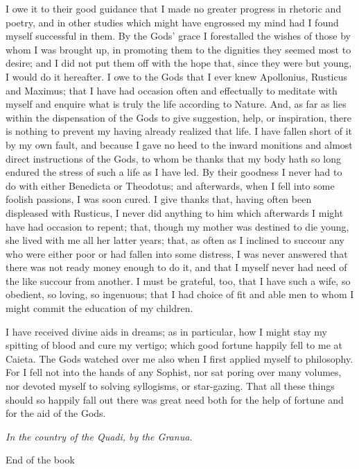 \documentclass{book}
\newcommand\terminus[1]{\vspace{2em}\emph{#1} \\[2em] \begin{center}End of the \ordinalstring{chapter} book\end{center}}
\begin{document}
I owe it to their good guidance that I made no greater progress in
rhetoric and poetry, and in other studies which might have engrossed
my mind had I found myself successful in them. By the Gods' grace I
forestalled the wishes of those by whom I was brought up, in promoting
them to the dignities they seemed most to desire; and I did not put
them off with the hope that, since they were but young, I would do it
hereafter. I owe to the Gods that I ever knew Apollonius, Rusticus and
Maximus; that I have had occasion often and effectually to meditate with
myself and enquire what is truly the life according to Nature. And, as
far as lies within the dispensation of the Gods to give suggestion,
help, or inspiration, there is nothing to prevent my having already
realized that life. I have fallen short of it by my own fault, and
because I gave no heed to the inward monitions and almost direct
instructions of the Gods, to whom be thanks that my body hath so long
endured the stress of such a life as I have led. By their goodness I
never had to do with either Benedicta or Theodotus; and afterwards, when
I fell into some foolish passions, I was soon cured. I give thanks that,
having often been displeased with Rusticus, I never did anything to
him which afterwards I might have had occasion to repent; that, though
my mother was destined to die young, she lived with me all her latter
years; that, as often as I inclined to succour any who were either poor
or had fallen into some distress, I was never answered that there was
not ready money enough to do it, and that I myself never had need of the
like succour from another. I must be grateful, too, that I have such a
wife, so obedient, so loving, so ingenuous; that I had choice of fit and
able men to whom I might commit the education of my children.

I have received divine aids in dreams; as in particular, how I might
stay my spitting of blood and cure my vertigo; which good fortune
happily fell to me at Caieta. The Gods watched over me also when I first
applied myself to philosophy. For I fell not into the hands of any
Sophist, nor sat poring over many volumes, nor devoted myself to solving
syllogisms, or star-gazing. That all these things should so happily fall
out there was great need both for the help of fortune and for the aid of
the Gods.

\terminus{In the country of the Quadi, by the Granua.}

\chapter[Say this to yourself...]{}
\end{document}
